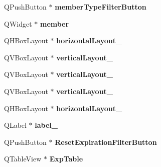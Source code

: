 \begin{DoxyCompactItemize}
\mbox{\label{class_ui___store_manager_window_ad1e3a8b79073b9d48588a59cf7c2eea7}} 
Q\+Push\+Button $\ast$ {\bfseries member\+Type\+Filter\+Button}
\item 
\mbox{\label{class_ui___store_manager_window_ad1b04778062cf3d9772a604237ef5b4e}} 
Q\+Widget $\ast$ {\bfseries member}
\item 
\mbox{\label{class_ui___store_manager_window_a2ea9191e09afaad54179875f5f665e65}} 
Q\+H\+Box\+Layout $\ast$ {\bfseries horizontal\+Layout\+\_}
\item 
\mbox{\label{class_ui___store_manager_window_a54919e279589fa007e5fe65c2941db54}} 
Q\+V\+Box\+Layout $\ast$ {\bfseries vertical\+Layout\+\_}
\item 
\mbox{\label{class_ui___store_manager_window_a823db5dce9cb757f6f1edd2aa1ff20de}} 
Q\+V\+Box\+Layout $\ast$ {\bfseries vertical\+Layout\+\_}
\item 
\mbox{\label{class_ui___store_manager_window_a85a44a19ddf0c1b0388d23badc2838b6}} 
Q\+V\+Box\+Layout $\ast$ {\bfseries vertical\+Layout\+\_}
\item 
\mbox{\label{class_ui___store_manager_window_a2d17e48c13c0aac9c5b37fd9bff96bef}} 
Q\+H\+Box\+Layout $\ast$ {\bfseries horizontal\+Layout\+\_}
\item 
\mbox{\label{class_ui___store_manager_window_acc66485b4a5d08107b4fcc45409dccbe}} 
Q\+Label $\ast$ {\bfseries label\+\_}
\item 
\mbox{\label{class_ui___store_manager_window_a27986a426d26eae67b84816b93cd7e70}} 
Q\+Push\+Button $\ast$ {\bfseries Reset\+Expiration\+Filter\+Button}
\item 
\mbox{\label{class_ui___store_manager_window_a8fddf4807c3ad3189074c651db2b0069}} 
Q\+Table\+View $\ast$ {\bfseries Exp\+Table}

\end{DoxyCompactItemize}

